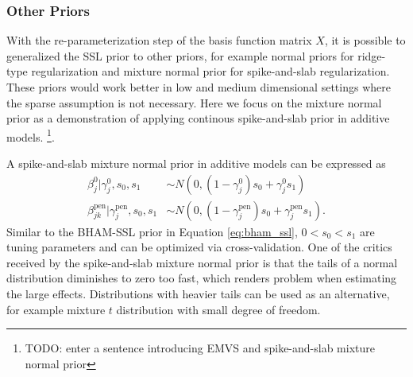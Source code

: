 \documentclass[AMA,STIX1COL,]{WileyNJD-v2}
\begin{document}

\hypertarget{other-priors}{%
\subsubsection{Other Priors}\label{other-priors}}

With the re-parameterization step of the basis function matrix \(X\), it
is possible to generalized the SSL prior to other priors, for example
normal priors for ridge-type regularization and mixture normal prior for
spike-and-slab regularization. These priors would work better in low and
medium dimensional settings where the sparse assumption is not
necessary. Here we focus on the mixture normal prior as a demonstration
of applying continous spike-and-slab prior in additive models.
\footnote{TODO: enter a sentence introducing EMVS and spike-and-slab
  mixture normal prior}.

A spike-and-slab mixture normal prior in additive models can be
expressed as \[
\begin{aligned}
  \beta^0_{j} |\gamma^0_{j},s_0,s_1 &\sim N(0,(1-\gamma^0_{j}) s_0 + \gamma^0_{j} s_1)\nonumber\\
  \beta^\text{pen}_{jk} | \gamma^\text{pen}_{j},s_0,s_1 &\sim N(0,(1-\gamma^\text{pen}_{j}) s_0 + \gamma^\text{pen}_{j} s_1).
\end{aligned}
\] Similar to the BHAM-SSL prior in Equation \ref{eq:bham_ssl},
\(0 < s_0 < s_1\) are tuning parameters and can be optimized via
cross-validation. One of the critics received by the spike-and-slab
mixture normal prior is that the tails of a normal distribution
diminishes to zero too fast, which renders problem when estimating the
large effects. Distributions with heavier tails can be used as an
alternative, for example mixture \(t\) distribution with small degree of
freedom.
\end{document}
